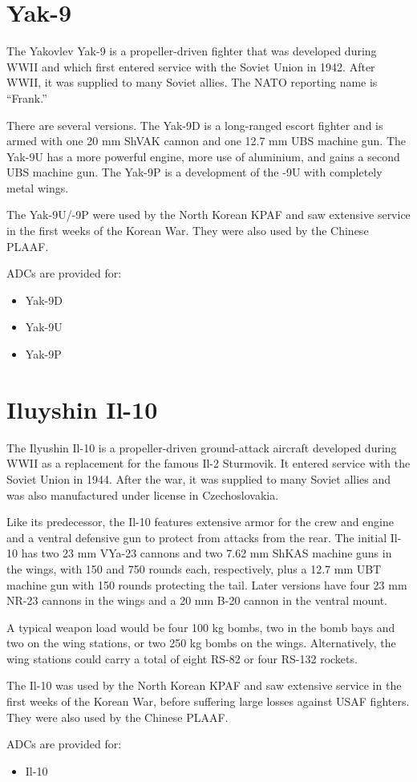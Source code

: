 \section*{Yak-9}

The Yakovlev Yak-9 is a propeller-driven fighter that was developed during WWII and which first entered service with the Soviet Union in 1942. After WWII, it was supplied to many Soviet allies. The NATO reporting name is “Frank.”

There are several versions. The Yak-9D is a long-ranged escort fighter and is armed with one 20 mm ShVAK cannon and one 12.7 mm UBS machine gun. The Yak-9U has a more powerful engine, more use of aluminium, and gains a second UBS machine gun. The Yak-9P is a development of the -9U with completely metal wings.

The Yak-9U/-9P were used by the North Korean KPAF and saw extensive service in the first weeks of the Korean War. They were also used by the Chinese PLAAF.

ADCs are provided for:
\begin{itemize}
\item Yak-9D
\item Yak-9U
\item Yak-9P
\end{itemize}

\section*{Iluyshin Il-10}

The Ilyushin Il-10 is a propeller-driven ground-attack aircraft developed during WWII as a replacement for the famous Il-2 Sturmovik. It entered service with the Soviet Union in 1944. After the war, it was supplied to many Soviet allies and was also manufactured under license in Czechoslovakia.

Like its predecessor, the Il-10 features extensive armor for the crew and engine and a ventral defensive gun to protect from attacks from the rear. The initial Il-10 has two 23 mm VYa-23 cannons and two 7.62 mm ShKAS machine guns in the wings, with 150 and 750 rounds each, respectively, plus a 12.7 mm UBT machine gun with 150 rounds protecting the tail. Later versions have four 23 mm NR-23 cannons in the wings and a 20 mm B-20 cannon in the ventral mount.

A typical weapon load would be four 100 kg bombs, two in the bomb bays and two on the wing stations, or two 250 kg bombs on the wings. Alternatively, the wing stations could carry a total of eight RS-82 or four RS-132 rockets.

The Il-10 was used by the North Korean KPAF and saw extensive service in the first weeks of the Korean War, before suffering large losses against USAF fighters. They were also used by the Chinese PLAAF.

ADCs are provided for:
\begin{itemize}
\item Il-10
\end{itemize}
